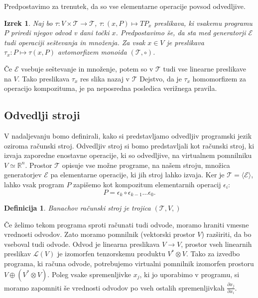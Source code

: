\documentclass{article}
\newcommand{\RR}{\mathbb{R}}
\newcommand{\E}{\mathcal{E}}
\newcommand{\T}{\mathcal{T}}
\newtheorem{definicija}{Definicija}[section]
\newtheorem{izrek}{Izrek}[section]
\begin{document}
Predpostavimo za trenutek, da so vse elementarne operacije povsod odvedljive. 

\begin{izrek}
  Naj bo $\tau:V\times \T\to \T$, $\tau:(x,P)\mapsto TP_x$ preslikava,  ki vsakemu programu
  $P$ priredi njegov odvod v dani točki $x$. Predpostavimo še, da sta med generatorji $\E$
  tudi operaciji seštevanja in množenja. Za vsak $x\in V$ je preslikava
  $\tau_x:P\mapsto \tau(x,P)$ avtomorfizem monoida $(\T,\circ)$. 
\end{izrek}
Če $\E$ vsebuje seštevanje in množenje, potem so v $\T$ tudi vse linearne preslikave
na $V$. Tako preslikava $\tau_x$ res slika nazaj v $\T$ Dejstvo, da je $\tau_x$ homomorfizem za operacijo kompozituma, je pa 
neposredna posledica verižnega pravila.

\subsection{Odvedlji stroji}
V nadaljevanju bomo definirali, kako si predstavljamo odvedljiv programski jezik
oziroma računski stroj. Odvedljiv stroj si bomo predstavljali kot računski
stroj, ki izvaja zaporedne enostavne operacije, ki so odvedljive, na virtualnem
pomnilniku $V\simeq\RR^n$. Prostor $\T$ opisuje vse možne programe, na našem
stroju, množica generatorjev $\E$ pa elementarne operacije, ki jih stroj lahko
izvaja. Ker je $\T=\langle \E \rangle$, lahko vsak program $P$ zapišemo kot
kompozitum elementarnih operacij $\epsilon_i$:
\[
P = \epsilon_k\circ\epsilon_{k-1}\ldots\epsilon_0.
\]  
\begin{definicija}
 Banachov računski stroj je trojica $(\T,V,)$  
\end{definicija}
Če želimo tekom programa sproti računati tudi odvode, moramo hraniti vmesne
vrednosti odvodov. Zato moramo pomnilnik (vektorski prostor $V$) razširiti, da
bo vseboval tudi odvode. Odvod je linearna preslikava $V\to V$, prostor
vseh linearnih preslikav $\mathcal{L}(V)$ je izomorfen tenzorskemu produktu
$V^*\otimes V$. Tako za izvedbo programa, ki računa odvode, potrebujemo virtualni
pomnilnik izomorfen prostoru $V\oplus (V^*\otimes V)$. Poleg vsake spremenljivke $x_j$, ki
jo uporabimo v programu, si moramo zapomniti še vrednosti odvodov po vseh
ostalih spremenljivkah $\frac{\partial x_j}{\partial x_i}$.   
\end{document}
